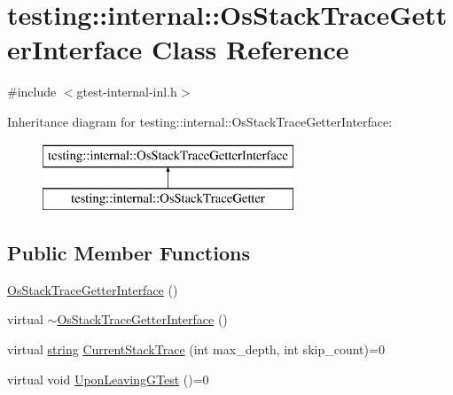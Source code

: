 \hypertarget{classtesting_1_1internal_1_1_os_stack_trace_getter_interface}{}\section{testing\+:\+:internal\+:\+:Os\+Stack\+Trace\+Getter\+Interface Class Reference}
\label{classtesting_1_1internal_1_1_os_stack_trace_getter_interface}


{\ttfamily \#include $<$gtest-\/internal-\/inl.\+h$>$}

Inheritance diagram for testing\+:\+:internal\+:\+:Os\+Stack\+Trace\+Getter\+Interface\+:\begin{figure}[H]
\begin{center}
\leavevmode
\includegraphics[height=2.000000cm]{classtesting_1_1internal_1_1_os_stack_trace_getter_interface}
\end{center}
\end{figure}
\subsection*{Public Member Functions}
\begin{DoxyCompactItemize}
\item 
\hyperlink{classtesting_1_1internal_1_1_os_stack_trace_getter_interface_afbe9eb0ca8775fbb98ff0720011b6708}{Os\+Stack\+Trace\+Getter\+Interface} ()
\item 
virtual \hyperlink{classtesting_1_1internal_1_1_os_stack_trace_getter_interface_a193f4a1de4af9b78010c659912df5a15}{$\sim$\+Os\+Stack\+Trace\+Getter\+Interface} ()
\item 
virtual \hyperlink{namespacetesting_1_1internal_a8e8ff5b11e64078831112677156cb111}{string} \hyperlink{classtesting_1_1internal_1_1_os_stack_trace_getter_interface_a6965eadb9b340808718fab9f1475c49a}{Current\+Stack\+Trace} (int max\+\_\+depth, int skip\+\_\+count)=0
\item 
virtual void \hyperlink{classtesting_1_1internal_1_1_os_stack_trace_getter_interface_a791bd120428b5a53d5eeba1b27296a39}{Upon\+Leaving\+G\+Test} ()=0
\end{DoxyCompactItemize}


